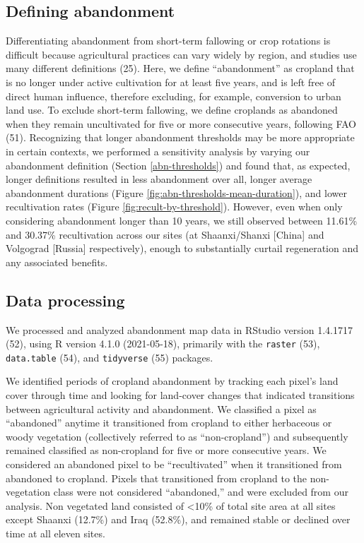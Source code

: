 \documentclass[9pt,twocolumn,twoside,]{pnas-new}
\begin{document}
\hypertarget{defining-abandonment}{%
\subsection{Defining abandonment}\label{defining-abandonment}}

Differentiating abandonment from short-term fallowing or crop rotations is difficult because agricultural practices can vary widely by region, and studies use many different definitions (25).
Here, we define ``abandonment'' as cropland that is no longer under active cultivation for at least five years, and is left free of direct human influence, therefore excluding, for example, conversion to urban land use.
To exclude short-term fallowing, we define croplands as abandoned when they remain uncultivated for five or more consecutive years, following FAO (51).
Recognizing that longer abandonment thresholds may be more appropriate in certain contexts, we performed a sensitivity analysis by varying our abandonment definition (Section \ref{abn-thresholds}) and found that, as expected, longer definitions resulted in less abandonment over all, longer average abandonment durations (Figure \ref{fig:abn-thresholds-mean-duration}), and lower recultivation rates (Figure \ref{fig:recult-by-threshold}).
However, even when only considering abandonment longer than 10 years, we still observed between 11.61\% and 30.37\% recultivation across our sites (at Shaanxi/Shanxi {[}China{]} and Volgograd {[}Russia{]} respectively), enough to substantially curtail regeneration and any associated benefits.

\hypertarget{data-processing}{%
\subsection{Data processing}\label{data-processing}}

We processed and analyzed abandonment map data in RStudio version 1.4.1717 (52), using R version 4.1.0 (2021-05-18), primarily with the \texttt{raster} (53), \texttt{data.table} (54), and \texttt{tidyverse} (55) packages.

We identified periods of cropland abandonment by tracking each pixel's land cover through time and looking for land-cover changes that indicated transitions between agricultural activity and abandonment.
We classified a pixel as ``abandoned'' anytime it transitioned from cropland to either herbaceous or woody vegetation (collectively referred to as ``non-cropland'') and subsequently remained classified as non-cropland for five or more consecutive years.
We considered an abandoned pixel to be ``recultivated'' when it transitioned from abandoned to cropland.
Pixels that transitioned from cropland to the non-vegetation class were not considered ``abandoned,'' and were excluded from our analysis.
Non vegetated land consisted of \textless10\% of total site area at all sites except Shaanxi (12.7\%) and Iraq (52.8\%), and remained stable or declined over time at all eleven sites.
\end{document}
